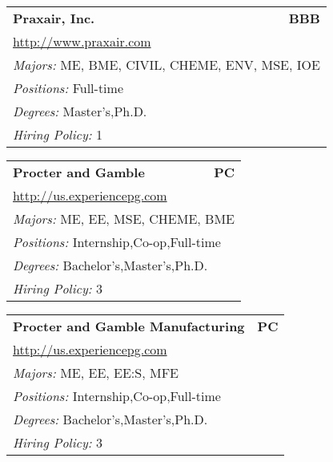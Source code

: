 \documentclass[twoside]{article}
\begin{document}
\begin{center}
\begin{multicols}{3}
\begin{FlushLeft}
\begin{minipage}{.9\columnwidth}
\end{minipage}
 
\begin{minipage}{.9\columnwidth}\begin{tabularx}{.95\columnwidth}{Xr}
                 {\Large\bf Praxair, Inc.} & {\Large\bf BBB}\\
    \multicolumn{2}{p{.95\columnwidth}}{\url{http://www.praxair.com}}\\
    \multicolumn{2}{p{.95\columnwidth}}{\emph{Majors:} ME, BME, CIVIL, CHEME, ENV, MSE, IOE}\\
    \multicolumn{2}{p{.95\columnwidth}}{\emph{Positions:} Full-time}\\
    \multicolumn{2}{p{.95\columnwidth}}{\emph{Degrees:} Master's,Ph.D.}\\
    \multicolumn{2}{p{.95\columnwidth}}{\emph{Hiring Policy:} 1}\\
    \end{tabularx}
    
\end{minipage}
 
\begin{minipage}{.9\columnwidth}\begin{tabularx}{.95\columnwidth}{Xr}
                 {\Large\bf Procter and Gamble} & {\Large\bf PC}\\
    \multicolumn{2}{p{.95\columnwidth}}{\url{http://us.experiencepg.com}}\\
    \multicolumn{2}{p{.95\columnwidth}}{\emph{Majors:} ME, EE, MSE, CHEME, BME}\\
    \multicolumn{2}{p{.95\columnwidth}}{\emph{Positions:} Internship,Co-op,Full-time}\\
    \multicolumn{2}{p{.95\columnwidth}}{\emph{Degrees:} Bachelor's,Master's,Ph.D.}\\
    \multicolumn{2}{p{.95\columnwidth}}{\emph{Hiring Policy:} 3}\\
    \end{tabularx}
    
\end{minipage}
 
\begin{minipage}{.9\columnwidth}\begin{tabularx}{.95\columnwidth}{Xr}
                 {\Large\bf Procter and Gamble Manufacturing} & {\Large\bf PC}\\
    \multicolumn{2}{p{.95\columnwidth}}{\url{http://us.experiencepg.com}}\\
    \multicolumn{2}{p{.95\columnwidth}}{\emph{Majors:} ME, EE, EE:S, MFE}\\
    \multicolumn{2}{p{.95\columnwidth}}{\emph{Positions:} Internship,Co-op,Full-time}\\
    \multicolumn{2}{p{.95\columnwidth}}{\emph{Degrees:} Bachelor's,Master's,Ph.D.}\\
    \multicolumn{2}{p{.95\columnwidth}}{\emph{Hiring Policy:} 3}\\
    \end{tabularx}
    

\end{minipage}
\end{FlushLeft}
\end{multicols}
\end{center}
\end{document}
